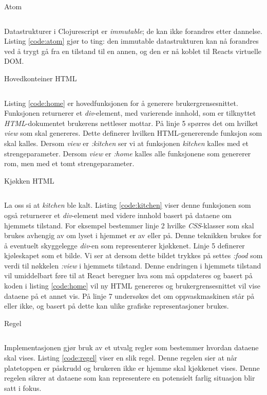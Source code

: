 \begin{listing}[ht]
\caption{Atom}
\inputminted[fontsize=\footnotesize, linenos]{clj}{kodesnutter/atom.clj}
\label{code:atom}
\end{listing}
Datastrukturer i Clojurescript er \emph{immutable}; de kan ikke forandres etter dannelse. Listing \ref{code:atom} gjør to ting: den immutable datastrukturen kan nå forandres ved å trygt gå fra en tilstand til en annen, og den er nå koblet til Reacts virtuelle DOM.
\begin{listing}[ht]
\caption{Hovedkonteiner HTML}
\inputminted[fontsize=\footnotesize, linenos]{clj}{kodesnutter/home.clj}
\label{code:home}
\end{listing}
Listing \ref{code:home} er hovedfunksjonen for å generere brukergrensesnittet. Funksjonen returnerer et \emph{div}-element, med varierende innhold, som er tilknyttet \emph{HTML}-dokumentet brukerens nettleser mottar. På linje 5 spørres det om hvilket \emph{view} som skal genereres. Dette definerer hvilken HTML-genererende funksjon som skal kalles. Dersom \emph{view} er \emph{:kitchen} ser vi at funksjonen \emph{kitchen} kalles med et strengeparameter. Dersom \emph{view} er \emph{:home} kalles alle funksjonene som genererer rom, men med et tomt strengeparameter.
\begin{listing}[ht]
\caption{Kjøkken HTML}
\inputminted[fontsize=\footnotesize, linenos]{clj}{kodesnutter/kitchen.clj}
\label{code:kitchen}
\end{listing}
La oss si at \emph{kitchen} ble kalt. Listing \ref{code:kitchen} viser denne funksjonen som også returnerer et \emph{div}-element med videre innhold basert på dataene om hjemmets tilstand. For eksempel bestemmer linje 2 hvilke \emph{CSS}-klasser som skal brukes avhengig av om lyset i hjemmet er av eller på. Denne teknikken brukes for å eventuelt skyggelegge \emph{div}-en som representerer kjøkkenet. Linje 5 definerer kjøleskapet som et bilde. Vi ser at dersom dette bildet trykkes på settes \emph{:food} som verdi til nøkkelen \emph{:view} i hjemmets tilstand. Denne endringen i hjemmets tilstand vil umiddelbart føre til at React beregner hva som må oppdateres og basert på koden i listing \ref{code:home} vil ny HTML genereres og brukergrensesnittet vil vise dataene på et annet vis. På linje 7 undersøkes det om oppvaskmaskinen står på eller ikke, og basert på dette kan ulike grafiske representasjoner brukes.
\begin{listing}[ht]
\caption{Regel}
\inputminted[fontsize=\footnotesize, linenos]{clj}{kodesnutter/rule.clj}
\label{code:regel}
\end{listing}
Implementasjonen gjør bruk av et utvalg regler som bestemmer hvordan dataene skal vises. Listing \ref{code:regel} viser en slik regel. Denne regelen sier at når platetoppen er påskrudd og brukeren ikke er hjemme skal kjøkkenet vises. Denne regelen sikrer at dataene som kan representere en potensielt farlig situasjon blir satt i fokus.









